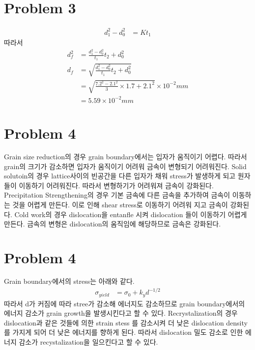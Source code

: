 \documentclass[a4paper]{oblivoir}
\begin{document}
\section{Problem 3}
\begin{align}
	d_{1}^{2}-d_{0}^{2} &= Kt_{1}
\end{align}
따라서
\begin{align}
	d_{f}^{2} &= \frac{d_{1}^{2}-d_{0}^{2}}{t_{1}}t_{2}+d_{0}^{2}\\
	d_{f} &= \sqrt{\frac{d_{1}^{2}-d_{0}^{2}}{t_{1}}t_{2}+d_{0}^{2}}\\
	&= \sqrt{\frac{7.2^{2}-2.1^{2}}{3}\times 1.7+2.1^{2}}\times 10^{-2} mm\\
	&= 5.59 \times 10^{-2}mm
\end{align}

\section{Problem 4}
Grain size reduction의 경우 grain boundary에서는 입자가 움직이기 어렵다. 따라서 grain의 크기가 감소하면 입자가 움직이기 어려워 금속이 변형되기 어려워진다. Solid solutoin의 경우 lattice사이의 빈공간을 다른 입자가 채워 stress가 발생하게 되고 원자들이 이동하기 어려워진다. 따라서 변형하기가 어려워져 금속이 강화된다. Precipitation Strengthening의 경우 기본 금속에 다른 금속을 추가하여 금속이 이동하는 것을 어렵게 만든다. 이로 인해 shear stress로 이동하기 어려워 지고 금속이 강화된다. Cold work의 경우 dislocation을 entanfle 시켜 dislocation 들이 이동하기 어렵게 만든다. 금속의 변형은 dislocation의 움직임에 해당하므로 금속은 강화된다.

\section{Problem 4}
Grain boundary에서의 stress는 아래와 같다.
\begin{align}
	\sigma_{yield} &= \sigma_{0} + k_{y}d^{-1/2}
\end{align}
따라서 d가 커짐에 따라 stree가 감소해 에너지도 감소하므로 grain boundary에서의 에너지 감소가 grain growth을 발생시킨다고 할 수 있다. Recrystalization의 경우 dislocation과 같은 것들에 의한 strain stess 를 감소시켜 더 낮은 dislocation density를 가지게 되어 더 낮은 에너지를 향하게 된다. 따라서 dislocation 밀도 감소로 인한 에너지 감소가 recystalization을 일으킨다고 할 수 있다.
\end{document}
